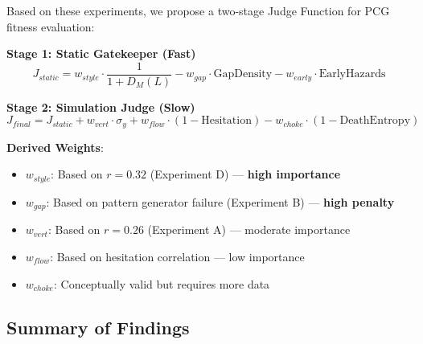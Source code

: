 \documentclass[11pt,a4paper]{article}
\theoremstyle{plain}
\theoremstyle{definition}
\theoremstyle{remark}
\begin{document}
Based on these experiments, we propose a two-stage Judge Function for PCG fitness evaluation:

\textbf{Stage 1: Static Gatekeeper (Fast)}
\begin{equation}
J_{static} = w_{style} \cdot \frac{1}{1+D_M(L)} - w_{gap} \cdot \text{GapDensity} - w_{early} \cdot \text{EarlyHazards}
\label{eq:judge-static}
\end{equation}

\textbf{Stage 2: Simulation Judge (Slow)}
\begin{equation}
J_{final} = J_{static} + w_{vert} \cdot \sigma_y + w_{flow} \cdot (1 - \text{Hesitation}) - w_{choke} \cdot (1 - \text{DeathEntropy})
\label{eq:judge-final}
\end{equation}

\textbf{Derived Weights}:
\begin{itemize}
    \item $w_{style}$: Based on $r = 0.32$ (Experiment D) --- \textbf{high importance}
    \item $w_{gap}$: Based on pattern generator failure (Experiment B) --- \textbf{high penalty}
    \item $w_{vert}$: Based on $r = 0.26$ (Experiment A) --- moderate importance
    \item $w_{flow}$: Based on hesitation correlation --- low importance
    \item $w_{choke}$: Conceptually valid but requires more data
\end{itemize}

\subsection{Summary of Findings}
\label{subsec:findings-summary}
\end{document}
